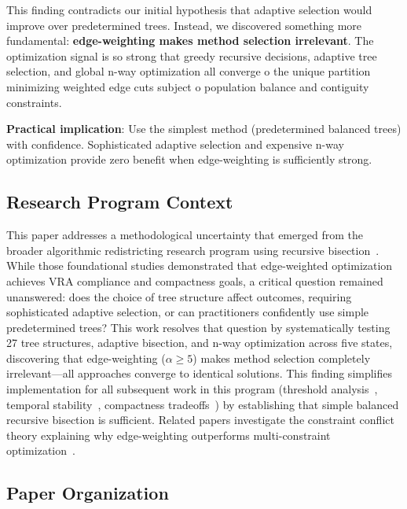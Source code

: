 This finding contradicts our initial hypothesis that adaptive selection would improve over predetermined trees. Instead, we discovered something more fundamental: \textbf{edge-weighting makes method selection irrelevant}. The optimization signal is so strong that greedy recursive decisions, adaptive tree selection, and global n-way optimization all converge 	o the unique partition minimizing weighted edge cuts subject 	o population balance and contiguity constraints.

\textbf{Practical implication}: Use the simplest method (predetermined balanced trees) with confidence. Sophisticated adaptive selection and expensive n-way optimization provide zero benefit when edge-weighting is sufficiently strong.

\subsection{Research Program Context}

This paper addresses a methodological uncertainty that emerged from the broader algorithmic redistricting research program using recursive bisection~\cite{della-libera-recursive-bisection,della-libera-edge-weighted}. While those foundational studies demonstrated that edge-weighted optimization achieves VRA compliance and compactness goals, a critical question remained unanswered: does the choice of tree structure affect outcomes, requiring sophisticated adaptive selection, or can practitioners confidently use simple predetermined trees? This work resolves that question by systematically testing 27 tree structures, adaptive bisection, and n-way optimization across five states, discovering that edge-weighting ($\alpha \geq 5$) makes method selection completely irrelevant—all approaches converge to identical solutions. This finding simplifies implementation for all subsequent work in this program (threshold analysis~\cite{della-libera-threshold-analysis}, temporal stability~\cite{della-libera-temporal-stability}, compactness tradeoffs~\cite{della-libera-compactness-tradeoff}) by establishing that simple balanced recursive bisection is sufficient. Related papers investigate the constraint conflict theory explaining why edge-weighting outperforms multi-constraint optimization~\cite{della-libera-multi-vs-edge}.

\subsection{Paper Organization}

